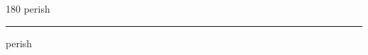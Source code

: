 
\begin{frame}
\begin{center}
\begin{turn}{180}
{\fontsize{2.5cm}{1em}\selectfont perish}
\end{turn}
\vspace{1em}\par  
\hrule
\vspace{1em}\par  
{\fontsize{2.5cm}{1em}\selectfont perish}
\end{center}
\end{frame}
